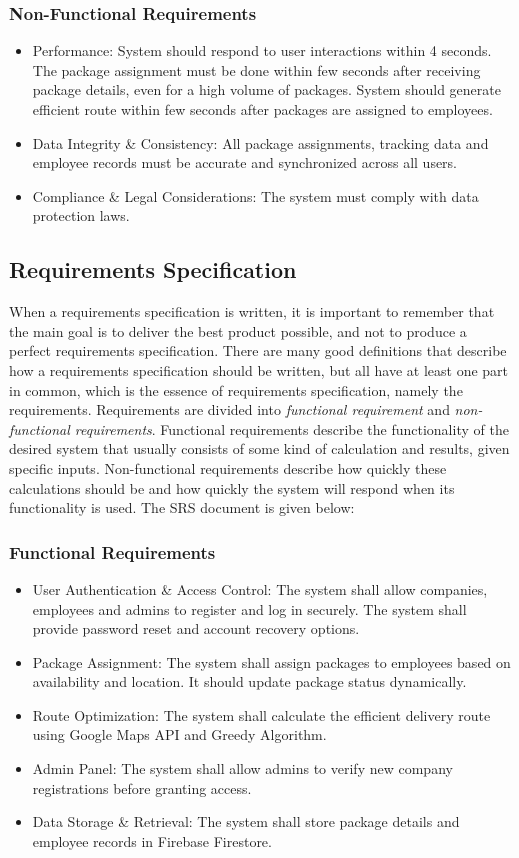 \subsubsection{Non-Functional Requirements}
\begin{itemize}
    \item Performance: System should respond to user interactions within 4 seconds. The package assignment must be done within few seconds after receiving package details, even for a high volume of packages. System should generate efficient route within few seconds after packages are assigned to employees.
    \item Data Integrity \& Consistency: All package assignments, tracking data and employee records must be accurate and synchronized across all users.
    \item Compliance \& Legal Considerations: The system must comply with data protection laws.
\end{itemize}
\subsection{Requirements Specification}
When a requirements specification is written, it is important to remember that the main goal is to deliver the best product possible, and not to produce a perfect requirements specification. There are many good definitions that describe how a requirements
specification should be written, but all have at least one part in common, which is the essence of requirements specification, namely the requirements. Requirements are divided into \textit{functional requirement} and \textit{non-functional requirements}. Functional requirements
describe the functionality of the desired system that usually consists of some kind of calculation and results, given specific inputs. Non-functional requirements describe how quickly these calculations should be and how quickly the system will respond when its functionality is used. The SRS document is given below:
\subsubsection{Functional Requirements}
\begin{itemize}
    \item User Authentication \& Access Control: The system shall allow companies, employees and admins to register and log in securely. The system shall provide password reset and account recovery options.
    \item Package Assignment: The system shall assign packages to employees based on availability and location. It should update package status dynamically.
    \item Route Optimization: The system shall calculate the efficient delivery route using Google Maps API and Greedy Algorithm.
    \item Admin Panel: The system shall allow admins to verify new company registrations before granting access.
    \item  Data Storage \& Retrieval: The system shall store package details and employee records in Firebase Firestore.
\end{itemize}
